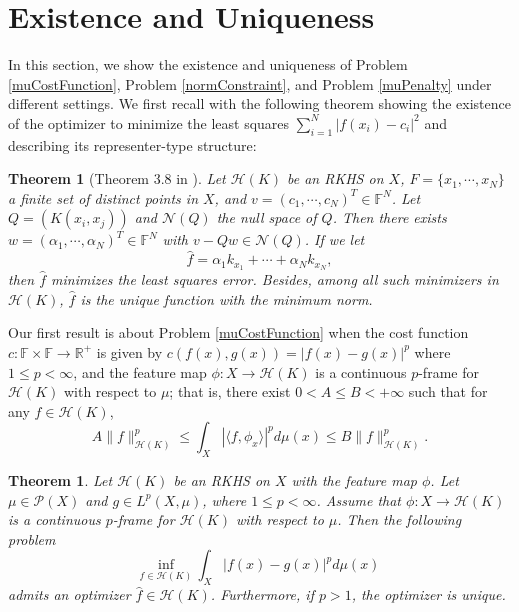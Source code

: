 \documentclass{amsart}
\numberwithin{equation}{section}
\theoremstyle{plain}
\newtheorem{theorem}[subsection]{Theorem}
\theoremstyle{remark}
\theoremstyle{definition}
\begin{document}


\section{Existence and Uniqueness}\label{section: existence and uniqueness}
In this section, we show the existence and uniqueness of Problem \ref{muCostFunction}, Problem \ref{normConstraint}, and Problem \ref{muPenalty} under different settings. 
We first recall with the following theorem showing the existence of the optimizer to minimize the least squares $\sum\limits_{i=1}^N \vert f(x_i) - c_i \vert ^2$ and describing its representer-type structure: 
\begin{theorem}[Theorem 3.8 in \cite{paulsen2016introduction}]%
    Let $\mathscr{H}(K)$ be an RKHS on $X$, $F= \{x_1,\cdots, x_N\}$ a finite set of distinct points in $X$, and $v = (c_1, \cdots, c_N)^{T} \in \mathbb{F}^{N}$. 
    Let $Q =(K(x_i, x_j))$ and $\mathscr{N}(Q)$ the null space of $Q$. 
    Then there exists $w = (\alpha_1, \cdots, \alpha_N)^T\in \mathbb{F}^N$ with $v-Qw \in \mathscr{N}(Q)$. If we let 
\begin{equation*}
            \hat{f} = \alpha_1 k_{x_1} + \cdots + \alpha_N k_{x_N}, 
\end{equation*}
then $\hat{f}$ minimizes the least squares error.
Besides, among all such minimizers in $\mathscr{H}(K)$, $\hat{f}$ is the unique function with the minimum norm. 
\end{theorem}

Our first result is about Problem \ref{muCostFunction} when the cost function $c: \mathbb{F} \times \mathbb{F} \rightarrow \mathbb{R}^+$ is given by $c(f(x), g(x)) = \vert f(x) - g(x) \vert ^p$ where  $1 \leq p<\infty$, and the feature map $\phi: X \rightarrow \mathscr{H}(K)$ is a continuous $p$-frame
for $\mathscr{H}(K)$ with respect to $\mu$; that is, there exist $0<A\leq B < +\infty $ such that for any $f \in {\mathscr{H}(K)}$, 
$$A\|f\|^p_{\mathscr{H}(K)} \leq \int_X |\langle f, \phi_x \rangle|^p d\mu(x) \leq B \|f\|^p_{\mathscr{H}(K)}.$$

\begin{theorem} \label{pexistance} 
  Let $\mathscr{H}(K)$ be an RKHS on $X$ with the feature map $\phi$.  
  Let $\mu \in \mathscr{P}(X)$ and $g \in L^p(X,\mu)$, where $1 \leq p<\infty$.
  Assume that $\phi: X \rightarrow \mathscr{H}(K)$ is a continuous $p$-frame for $\mathscr{H}(K)$ with respect to $\mu$. 
  Then the following problem 
    \begin{equation*}\label{muPNorm}
    \underset{f \in \mathscr{H}(K)}{\text{inf}} \ \int_{X} \vert f(x) - g(x) \vert ^p d\mu(x)
\end{equation*}
admits an optimizer $\hat{f} \in \mathscr{H}(K)$. Furthermore, if $p>1$, 
the optimizer is unique.
\end{theorem}
\end{document}
